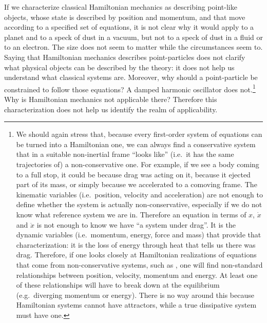 \documentclass[11pt]{elsarticle}
\begin{document}
If we characterize classical Hamiltonian mechanics as describing point-like objects, whose state is described by position and momentum, and that move according to a specified set of equations, it is not clear why it would apply to a planet and to a speck of dust in a vacuum, but not to a speck of dust in a fluid or to an electron. The size does not seem to matter while the circumstances seem to. Saying that Hamiltonian mechanics describes point-particles does not clarify what physical objects can be described by the theory: it does not help us understand what classical systems are. Moreover, why should a point-particle be constrained to follow those equations? A damped harmonic oscillator does not.\footnote{We should again stress that, because every first-order system of equations can be turned into a Hamiltonian one\cite{AllSystemsAreHam}, we can always find a conservative system that in a suitable non-inertial frame ``looks like'' (i.e.~it has the same trajectories of) a non-conservative one. For example, if we see a body coming to a full stop, it could be because drag was acting on it, because it ejected part of its mass, or simply because we accelerated to a comoving frame. The kinematic variables (i.e.~position, velocity and acceleration) are not enough to define whether the system is actually non-conservative, especially if we do not know what reference system we are in. Therefore an equation in terms of $x$, $\dot{x}$ and $\ddot{x}$ is not enough to know we have ``a system under drag''. It is the dynamic variables (i.e.~momentum, energy, force and mass) that provide that characterization: it is the loss of energy through heat that tells us there was drag. Therefore, if one looks closely at Hamiltonian realizations of equations that come from non-conservative systems, such as \cite{chandrasekar2007lagrangian}, one will find non-standard relationships between position, velocity, momentum and energy. At least one of these relationships will have to break down at the equilibrium (e.g.~diverging momentum or energy). There is no way around this because Hamiltonian systems cannot have attractors, while a true dissipative system must have one.} Why is Hamiltonian mechanics not applicable there? Therefore this characterization does not help us identify the realm of applicability.
\end{document}
